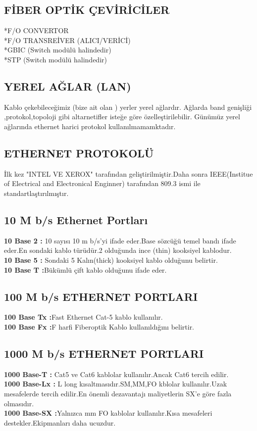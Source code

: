 \subsection*{FİBER OPTİK ÇEVİRİCİLER}
*F/O CONVERTOR \\
*F/O TRANSREİVER (ALICI/VERİCİ)\\
*GBIC  (Switch modülü halindedir) \\
*STP  (Switch modülü halindedir) \\

\subsection*{YEREL AĞLAR (LAN)}
Kablo çekebileceğimiz (bize ait  olan ) yerler yerel ağlardır.
Ağlarda band genişliği ,protokol,topoloji gibi altarnetifler isteğe göre özelleştirilebilir.
Günümüz yerel ağlarında ethernet harici protokol kullanılmamamktadır.
\subsection*{ETHERNET PROTOKOLÜ}
İlk kez "INTEL VE XEROX" tarafından geliştirilmiştir.Daha sonra IEEE(Institue of Electrical and Electronical Enginner) tarafından 809.3 ismi ile standartlaştırılmıştır.
\subsection*{10 M b/s Ethernet Portları}
\textbf{10 Base 2 :} 10 sayısı 10 m b/s'yi ifade eder.Base sözcüğü temel bandı ifade eder.En sondaki kablo türüdür.2 olduğunda ince (thin) kooksiyel kablodur.\\
\textbf{10 Base 5 :} Sondaki 5 Kalın(thick) kooksiyel kablo olduğunu belirtir.\\
\textbf{10  Base T :}Bükümlü çift kablo olduğunu ifade eder.\\
\subsection*{100 M b/s ETHERNET PORTLARI}
\textbf{100 Base Tx :}Fast Ethernet Cat-5 kablo kullanılır.\\
\textbf{100 Base Fx :}F harfi Fiberoptik Kablo kullanıldığını belirtir.\\
\subsection*{1000 M b/s ETHERNET PORTLARI}
\textbf{1000 Base-T :} Cat5 ve Cat6 kablolar kullanılır.Ancak Cat6 tercih edilir.\\
\textbf{1000 Base-Lx :} L long kısaltmasıdır.SM,MM,FO kblolar kullanılır.Uzak mesafelerde tercih edilir.En önemli dezavantajı maliyetlerin SX'e göre fazla olmasıdır.\\
\textbf{1000 Base-SX :}Yalnızca mm FO kablolar kullanılır.Kısa mesafeleri destekler.Ekipmanları daha ucuzdur.\\
